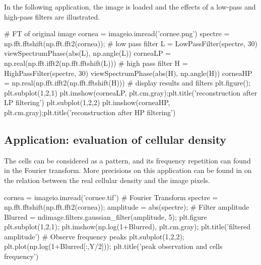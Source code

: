 In the following application, the image is loaded and the effects of a low-pass and high-pass filters are illustrated.
\begin{python}
# FT of original image
cornea = imageio.imread('cornee.png')
spectre = np.fft.fftshift(np.fft.fft2(cornea));
# low pass filter
L = LowPassFilter(spectre, 30)
viewSpectrumPhase(abs(L), np.angle(L))
corneaLP = np.real(np.fft.ifft2(np.fft.fftshift(L)))
# high pass filter
H = HighPassFilter(spectre, 30)
viewSpectrumPhase(abs(H), np.angle(H))
corneaHP = np.real(np.fft.ifft2(np.fft.fftshift(H)))
# display results and filters
plt.figure();
plt.subplot(1,2,1)
plt.imshow(corneaLP, plt.cm.gray);plt.title('reconstruction after LP filtering')
plt.subplot(1,2,2)
plt.imshow(corneaHP, plt.cm.gray);plt.title('reconstruction after HP filtering')
 \end{python}

\vspace*{-5pt}
\subsection{Application: evaluation of cellular density}
The cells can be considered as a pattern, and its frequency repetition can found in the Fourier transform. More precisions on this application can be found in \cite{Ruggeri2005,Grisan2005,Ruggeri2007,Selig2015} on the relation between the real cellular density and the image pixels.

\begin{python}
cornea = imageio.imread('cornee.tif')
# Fourier Transform
spectre = np.fft.fftshift(np.fft.fft2(cornea));
amplitude = abs(spectre);
# Filter amplitude
Blurred = ndimage.filters.gaussian_filter(amplitude, 5);
plt.figure
plt.subplot(1,2,1); 
plt.imshow(np.log(1+Blurred), plt.cm.gray); 
plt.title('filtered amplitude')
# Observe frequency peaks
plt.subplot(1,2,2);
plt.plot(np.log(1+Blurred[:,Y/2])); 
plt.title('peak observation and cells frequency')
 \end{python}

